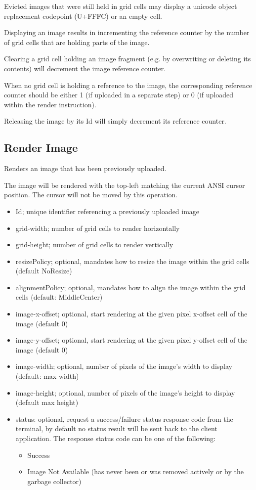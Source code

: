\documentclass{article}
\begin{document}
Evicted images that were still held in grid cells may display a unicode object replacement
codepoint (U+FFFC) or an empty cell.

Displaying an image results in incrementing the reference counter by the number of grid cells
that are holding parts of the image.

Clearing a grid cell holding an image fragment (e.g. by overwriting or deleting its contents)
will decrement the image reference counter.

When no grid cell is holding a reference to the image,
the corresponding reference counter should be either 1 (if uploaded in a separate step)
or 0 (if uploaded within the render instruction).

Releasing the image by its Id will simply decrement its reference counter.

\subsection{Render Image}

Renders an image that has been previously uploaded.

The image will be rendered with the top-left matching the current ANSI cursor position.
The cursor will not be moved by this operation.

\begin{itemize}
    \item Id; unique identifier referencing a previously uploaded image
    \item grid-width; number of grid cells to render horizontally
    \item grid-height; number of grid cells to render vertically
    \item resizePolicy; optional, mandates how to resize the image within the grid cells (default NoResize)
    \item alignmentPolicy; optional, mandates how to align the image within the grid cells (default: MiddleCenter)
    \item image-x-offset; optional, start rendering at the given pixel x-offset cell of the image (default 0)
    \item image-y-offset; optional, start rendering at the given pixel y-offset cell of the image (default 0)
    \item image-width; optional, number of pixels of the image's width to display (default: max width)
    \item image-height; optional, number of pixels of the image's height to display (default max height)
    \item status: optional, request a success/failure status response code from the terminal, by default
        no status result will be sent back to the client application.
        The response status code can be one of the following:
        \begin{itemize}
            \item Success
            \item Image Not Available (has never been or was removed actively or by the garbage collector)
        \end{itemize}
\end{itemize}
\end{document}
